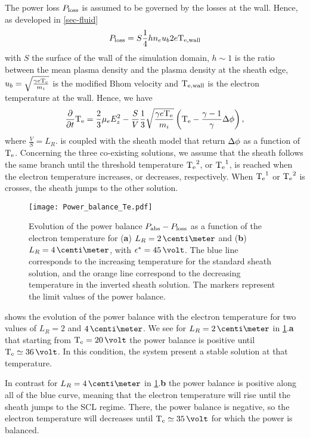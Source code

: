     The power loss $P_{\rm loss}$ is assumed to be governed by the losses at the wall.
    Hence, as developed in \cref{sec-fluid}
    \begin{equation} \label{eq-Ploss}
      P_{\rm loss} = S \frac{1}{4} h n_e u_b 2 e\mathrm{T_{e, wall}}
    \end{equation}
    with $S$ the surface of the wall of the simulation domain, $h \sim 1$ is the ratio between the mean plasma density and the plasma density at the sheath edge, $u_b = \sqrt{\frac{\gamma e \mathrm{T_e}}{m_i}}$ is the modified Bhom velocity and $\mathrm{T_{e, wall}}$ is the electron temperature at the wall.
    Hence, we have
    \begin{equation} \label{eq-MG_bis}
    \frac{\partial }{\partial t} \mathrm{T_e} = \frac{2}{3} \mu_e  E_z^2 - \frac{S}{V} \frac{1}{3} \sqrt{\frac{\gamma e \mathrm{T_e}}{m_i}}  \left( \mathrm{T_e} - \frac{\gamma - 1}{\gamma} \Delta \phi \right),
    \end{equation}
    where $\frac{V}{S} = L_R$.
     is coupled with the sheath model that return $\Delta \phi$ as a function of $\mathrm{T_e}$.
    Concerning the three co-existing solutions, we assume that the sheath follows the same branch until the threshold temperature $\mathrm{T_e}^2$, or $\mathrm{T_e}^1$, is reached when the electron temperature increases, or decreases, respectively.
    When $\mathrm{T_e}^1$ or $\mathrm{T_e}^2$ is crosses, the sheath jumps to the other solution.
    
    
    \begin{figure}[!hbt]
      \centering
      \texttt{[image: Power\_balance\_Te.pdf]}
      \caption{Evolution of the power balance $P_{\rm abs}-P_{\rm loss}$ as a function of the electron temperature for ({\bf a}) $L_R=2\,\centi\meter$ and ({\bf b}) $L_R=4\,\centi\meter$, with $\crover=45\,\volt$. The blue line corresponds to the increasing temperature for the standard sheath solution, and the orange line correspond to the decreasing temperature in the inverted sheath solution. The markers represent the limit values of the power balance.}
      \label{fig-powerbalance}
    \end{figure}
    
     shows the evolution of the power balance with the electron temperature for two values of $L_R=2$ and $4\,\centi\meter$.
    We see for $L_R=2\,\centi\meter$ in \cref{fig-powerbalance}.{\bf a} that starting from $\Te=20\,\volt$ the power balance is positive until $\Te\simeq36\,\volt$.
    In this condition, the system present a stable solution at that temperature.
    
    In contrast for $L_R=4\,\centi\meter$ in \cref{fig-powerbalance}.{\bf b} the power balance is positive along all of the blue curve, meaning that the electron temperature will rise until the sheath jumps to the \ac{SCL} regime.
    There, the power balance is negative, so the electron temperature will decreases until $\Te\simeq35\,\volt$ for which the power is balanced.
    
